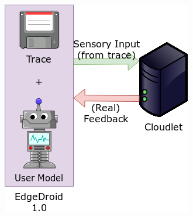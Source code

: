 \documentclass[portrait, a1]{KTHEEposter}
\begin{document}
\begin{pcolumns}[3]
\begin{pcolumn}[2]
\begin{pframe}[1.25]
\begin{center}
                \includegraphics[width=.7\linewidth]{img/trace_idea_2}
                \makeatletter
                \renewcommand{\fnum@figure}{\theoldfigure}
                \makeatother
                \setcounter{figure}{0}
            \end{center}

        \end{pframe}
    \end{pcolumn}%
    \begin{pcolumn}[2]
        \begin{pframe}[.9]

\end{pframe}
\end{pcolumn}
\end{pcolumns}
\end{document}
